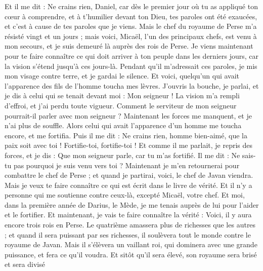 \begin{multicols}{2}
Et il me dit : Ne crains rien, Daniel, car dès le premier jour où tu as appliqué ton cœur à comprendre, et à t'humilier devant ton Dieu, tes paroles ont été exaucées, et c'est à cause de tes paroles que je viens.
Mais le chef du royaume de Perse m'a résisté vingt et un jours ; mais voici, Micaël, l'un des principaux chefs, est venu à mon secours, et je suis demeuré là auprès des rois de Perse.
Je viens maintenant pour te faire connaître ce qui doit arriver à ton peuple dans les derniers jours, car la vision s'étend jusqu'à ces jours-là.
Pendant qu'il m'adressait ces paroles, je mis mon visage contre terre, et je gardai le silence.
Et voici, quelqu'un qui avait l'apparence des fils de l'homme toucha mes lèvres. J'ouvris la bouche, je parlai, et je dis à celui qui se tenait devant moi : Mon seigneur ! La vision m'a rempli d'effroi, et j'ai perdu toute vigueur.
Comment le serviteur de mon seigneur pourrait-il parler avec mon seigneur ? Maintenant les forces me manquent, et je n'ai plus de souffle.
Alors celui qui avait l'apparence d'un homme me toucha encore, et me fortifia.
Puis il me dit : Ne crains rien, homme bien-aimé, que la paix soit avec toi ! Fortifie-toi, fortifie-toi ! Et comme il me parlait, je repris des forces, et je dis : Que mon seigneur parle, car tu m'as fortifié.
Il me dit : Ne sais-tu pas pourquoi je suis venu vers toi ? Maintenant je m'en retournerai pour combattre le chef de Perse ; et quand je partirai, voici, le chef de Javan viendra.
Mais je veux te faire connaître ce qui est écrit dans le livre de vérité. Et il n'y a personne qui me soutienne contre ceux-là, excepté Micaël, votre chef.
\VerseOne{}Et moi, dans la première année de Darius, le Mède, je me tenais auprès de lui pour l'aider et le fortifier.
Et maintenant, je vais te faire connaître la vérité : Voici, il y aura encore trois rois en Perse. Le quatrième amassera plus de richesses que les autres ; et quand il sera puissant par ses richesses, il soulèvera tout le monde contre le royaume de Javan.
Mais il s'élèvera un vaillant roi, qui dominera avec une grande puissance, et fera ce qu'il voudra.
Et sitôt qu'il sera élevé, son royaume sera brisé et sera divisé
\end{multicols}
